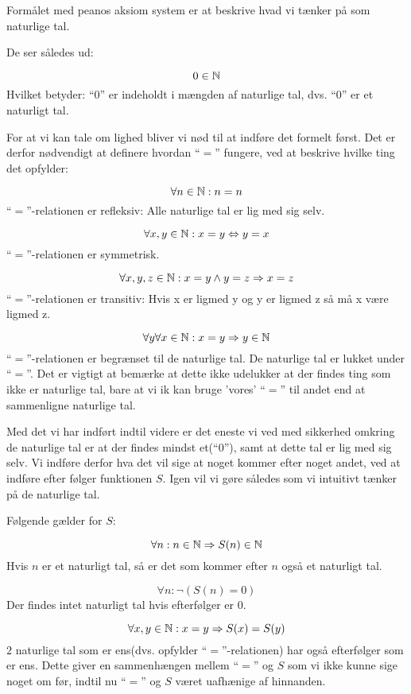 Formålet med peanos aksiom system er at beskrive hvad vi tænker på som naturlige tal.

De ser således ud:

\[ 0 \in \mathbb{N} \]
Hvilket betyder: ``$0$'' er indeholdt i mængden af naturlige tal, dvs. ``$0$'' er et naturligt tal.

For at vi kan tale om lighed bliver vi nød til at indføre det formelt først.
Det er derfor nødvendigt at definere hvordan ``$=$'' fungere, ved at beskrive hvilke ting det opfylder:

\[ \forall n \in \mathbb{N}: n = n \]
``$=$''-relationen er refleksiv: Alle naturlige tal er lig med sig selv.

\[ \forall x,y \in \mathbb{N}: x = y \Leftrightarrow y = x \]
``$=$''-relationen er symmetrisk.

\[ \forall x,y,z \in \mathbb{N}: x = y \land y = z \Rightarrow x = z \]
``$=$''-relationen er transitiv: Hvis x er ligmed y og y er ligmed z så må x være ligmed z.

\[ \forall y \forall x \in \mathbb{N}: x = y \Rightarrow y \in \mathbb{N} \]
``$=$''-relationen er begrænset til de naturlige tal. De naturlige tal er lukket under ``$=$''.
Det er vigtigt at bemærke at dette ikke udelukker at der findes ting som ikke er naturlige tal,
bare at vi ik kan bruge 'vores' ``$=$'' til andet end at sammenligne naturlige tal.


Med det vi har indført indtil videre er det eneste vi ved med sikkerhed omkring de naturlige tal er at der findes mindst et(``0''),
samt at dette tal er lig med sig selv. Vi indføre derfor hva det vil sige at noget kommer efter noget andet,
ved at indføre efter følger funktionen $S$. Igen vil vi gøre således som vi intuitivt tænker på de naturlige tal.

Følgende gælder for $S$:

\[ \forall n: n \in \mathbb{N} \Rightarrow S(n) \in \mathbb{N} \]
Hvis $n$ er et naturligt tal, så er det som kommer efter $n$ også et naturligt tal.

\[ \forall n: \neg (S(n) = 0) \]
Der findes intet naturligt tal hvis efterfølger er $0$.

\[ \forall x, y \in \mathbb{N}: x = y \Rightarrow S(x) = S(y) \]
$2$ naturlige tal som er ens(dvs. opfylder ``$=$''-relationen) har også efterfølger som er ens.
Dette giver en sammenhængen mellem ``$=$'' og $S$ som vi ikke kunne sige noget om før,
indtil nu ``$=$'' og $S$ været uafhænige af hinnanden.

